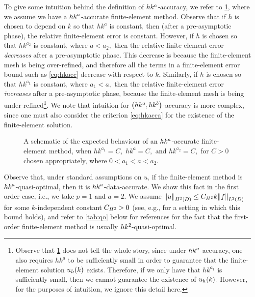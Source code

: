 To give some intuition behind the definition of $\hka{a}$-accuracy, we refer to \cref{fig:dataaccuracyplot}, where we assume we have a $\hka{a}$-accurate finite-element method. Observe that if $h$ is chosen to depend on $k$ so that $hk^{a}$ is constant, then (after a pre-asymptotic phase), the relative finite-element error is constant. However, if $h$ is chosen so that $hk^{a_2}$ is constant, where $a < a_2,$ then the relative finite-element error \emph{decreases} after a pre-asymptotic phase. This decrease is because the finite-element mesh is being over-refined, and therefore all the terms in a finite-element error bound such as \cref{eq:hkacc} decrease with respect to $k.$ Similarly, if $h$ is chosen so that $hk^{a_1}$ is constant, where $a_1 < a,$ then the relative finite-element error \emph{increases} after a pre-asymptotic phase, because the finite-element mesh is being under-refined\footnote{Observe that \cref{fig:dataaccuracyplot} does not tell the whole story, since under $\hka{a}$-accuracy, one also requires $hk^{a}$ to be sufficiently small in order to guarantee that the finite-element solution $u_{h}(k)$ exists. Therefore, if we only have that $hk^{a_1}$ is sufficiently small, then we cannot guarantee the existence of $u_{h}(k).$ However, for the purposes of intuition, we ignore this detail here.}. We note that intuition for $\hk{a}{b}$-accuracy is more complex, since one must also consider the criterion \cref{eq:hkacca} for the existence of the finite-element solution.

\begin{figure}
  \centering

\caption[A schematic of the expected behaviour of an $\hka{a}$-accurate finite-element method.]{A schematic of the expected behaviour of an $\hka{a}$-accurate finite-element method, when $hk^{a_1} = C,$ $hk^{a} = C,$ and $hk^{a_2} = C,$ for $C>0$ chosen appropriately, where $0 < a_{1} < a < a_{2}.$\label{fig:dataaccuracyplot}}
\end{figure}


Observe that, under standard assumptions on $u$, if the finite-element method is $\hka{a}$-quasi-optimal, then it is $\hka{a}$-data-accurate. We show this fact in the first order case, i.e., we take $p=1$ and $a=2.$ We assume $\NHtD{u} \leq\CHt k\NLtD{f}$ for some $k$-independent constant $C_{H^{2}}>0$ (see, e.g., \cite[Lemma 2.12]{GaGrSp:15} for a setting in which this bound holds), and refer to  \cref{tab:qo} below for references for the fact that the first-order finite-element method is usually $hk^{2}$-quasi-optimal.

